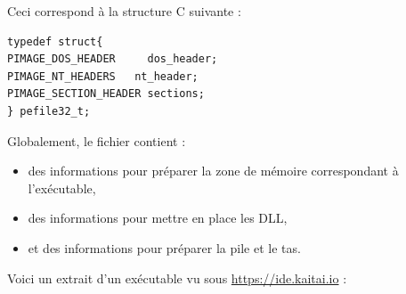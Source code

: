 \documentclass{book}
\newcommand{\Windows}{{\sc windows}}
\begin{document}
Ceci correspond à la structure C suivante : 

\begin{verbatim}
typedef struct{
PIMAGE_DOS_HEADER     dos_header;
PIMAGE_NT_HEADERS   nt_header;
PIMAGE_SECTION_HEADER sections;
} pefile32_t;
\end{verbatim}


\medskip
Globalement, le fichier contient : 
\begin{itemize}
	\item des informations pour préparer la zone de mémoire correspondant à  l'exécutable,
	\item des informations pour mettre en place les DLL,
	\item et des informations pour préparer la pile et le tas.
\end{itemize}



\medskip
Voici un extrait d'un exécutable vu sous \url{https://ide.kaitai.io} : 

\medskip
\noindent
{}

\end{document}

